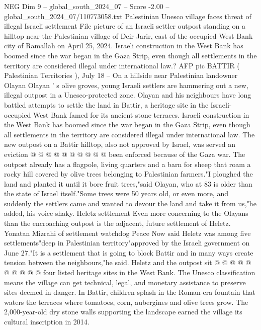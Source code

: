 \begin{textsample}{NEG Dim 9 – global\_south\_2024\_07 – Score -2.00 – global\_south\_2024\_07/110773058.txt}  \label{ex:f9_neg_347}
Palestinian Unesco village faces threat of illegal Israeli settlement File picture of an Israeli settler outpost standing on a hilltop near the Palestinian village of Deir Jarir, east of the occupied West Bank city of Ramallah on April 25, 2024.
Israeli construction in the West Bank has boomed since the war began in the Gaza Strip, even though all settlements in the territory are considered illegal under international law.?
AFP pic BATTIR ( Palestinian Territories ), July 18 -- On a hillside near Palestinian landowner Olayan Olayan ' s olive groves, young Israeli settlers are hammering out a new, illegal outpost in a Unesco-protected zone.
Olayan and his neighbours have long battled attempts to settle the land in Battir, a heritage site in the Israeli-occupied West Bank famed for its ancient stone terraces.
Israeli construction in the West Bank has boomed since the war began in the Gaza Strip, even though all settlements in the territory are considered illegal under international law.
The new outpost on a Battir hilltop, also not approved by Israel, was served an eviction @ @ @ @ @ @ @ @ @ @ been enforced because of the Gaza war.
The outpost already has a flagpole, living quarters and a barn for sheep that roam a rocky hill covered by olive trees belonging to Palestinian farmers."I ploughed the land and planted it until it bore fruit trees,"said Olayan, who at 83 is older than the state of Israel itself."Some trees were 50 years old, or even more, and suddenly the settlers came and wanted to devour the land and take it from us,"he added, his voice shaky.
Heletz settlement Even more concerning to the Olayans than the encroaching outpost is the adjacent, future settlement of Heletz.
Yonatan Mizrahi of settlement watchdog Peace Now said Heletz was among five settlements"deep in Palestinian territory"approved by the Israeli government on June 27."It is a settlement that is going to block Battir and in many ways create tension between the neighbours,"he said.
Heletz and the outpost sit @ @ @ @ @ @ @ @ @ @ four listed heritage sites in the West Bank.
The Unesco classification means the village can get technical, legal, and monetary assistance to preserve sites deemed in danger.
In Battir, children splash in the Roman-era fountain that waters the terraces where tomatoes, corn, aubergines and olive trees grow.
The 2,000-year-old dry stone walls supporting the landscape earned the village its cultural inscription in 2014.

\end{textsample}
